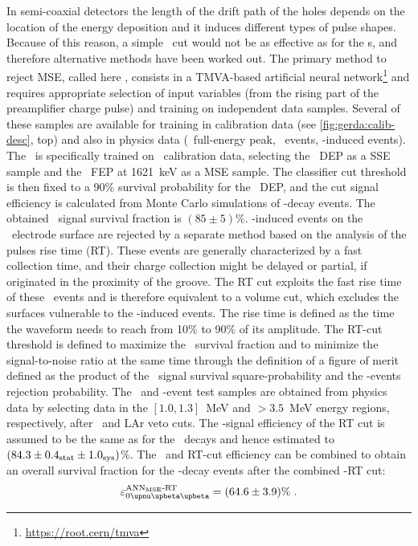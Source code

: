 In semi-coaxial detectors the length of the drift path of the holes depends on the
location of the energy deposition and it induces different types of pulse shapes. Because
of this reason, a simple \aoe\ cut would not be as effective as for the \bege{}s, and
therefore alternative methods have been worked out.
\newpar
The primary method to reject MSE, called here \annmse, consists in a TMVA-based
artificial neural network\footnote{\url{https://root.cern/tmva}} and requires
appropriate selection of input variables (from the rising part of the preamplifier charge
pulse) and training on independent data samples. Several of these samples are available
for training in calibration data (see \cref{fig:gerda:calib-desc}, top) and also in physics data (\kvz\
full-energy peak, \nnbb\ events, \a-induced events). The \annmse\ is specifically trained
on \Th\ calibration data, selecting the \Tl\ DEP as a SSE sample and the \Bil\ FEP at
1621~keV as a MSE sample. The classifier cut threshold is then fixed to a 90\% survival
probability for the \Th\ DEP, and the cut signal efficiency is calculated from Monte Carlo
simulations of \onbb-decay events. The obtained \annmse\ signal survival fraction is $(85
\pm 5)$\%.
\newpar
\a-induced events on the \pplus\ electrode surface are rejected by a separate method based
on the analysis of the pulses rise time (RT). These events are generally characterized by
a fast collection time, and their charge collection might be delayed or partial, if
originated in the proximity of the groove. The RT cut exploits the fast rise time of these
\a\ events and is therefore equivalent to a volume cut, which excludes the surfaces
vulnerable to the \a-induced events. The rise time is defined as the time the waveform
needs to reach from 10\% to 90\% of its amplitude. The RT-cut threshold is defined to
maximize the \onbb\ survival fraction and to minimize the signal-to-noise ratio at the
same time through the definition of a figure of merit defined as the product of the \nnbb\
signal survival square-probability and the \a-events rejection probability. The \nnbb\ and
\a-event test samples are obtained from physics data by selecting data in the $[1.0,
1.3]$~MeV and $>3.5$~MeV energy regions, respectively, after \annmse\ and LAr veto cuts.
The \onbb-signal efficiency of the RT cut is assumed to be the same as for the \nnbb\
decays and hence estimated to $(84.3 \pm {0.4}_\text{stat} \pm {1.0}_\text{sys})$\%. The \annmse\ and
RT-cut efficiency can be combined to obtain an overall survival fraction for the
\onbb-decay events after the combined \annmse-RT cut:
\[
  \epsilon_\onbbM^\text{\annmse-RT} = (64.6 \pm 3.9) \% \;.
\]

